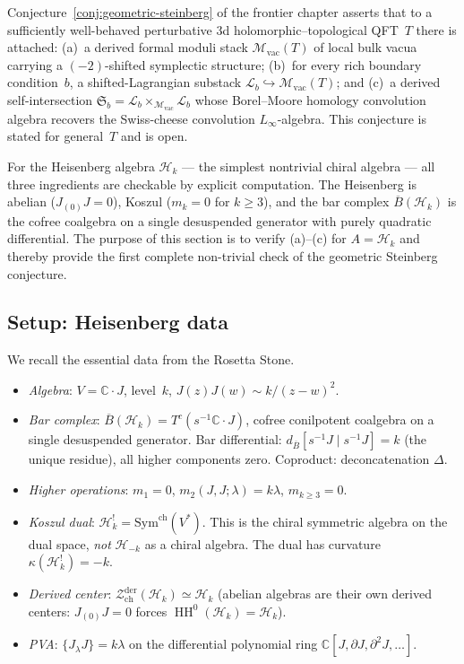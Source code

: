 \documentclass[11pt]{article}
\newcommand{\cM}{\mathcal{M}}
\newcommand{\cH}{\mathcal{H}}
\newcommand{\cZ}{\mathcal{Z}}
\newcommand{\cL}{\mathcal{L}}
\newcommand{\barB}{\overline{B}}
\newcommand{\C}{\mathbb{C}}
\newcommand{\HH}{\operatorname{HH}}
\newcommand{\Zder}{\cZ^{\mathrm{der}}_{\mathrm{ch}}}
\begin{document}
Conjecture~\ref{conj:geometric-steinberg} of the frontier chapter
asserts that to a sufficiently well-behaved perturbative 3d
holomorphic--topological QFT~$T$ there is attached: (a)~a derived
formal moduli stack $\cM_{\mathrm{vac}}(T)$ of local bulk vacua
carrying a $(-2)$-shifted symplectic structure; (b)~for every rich
boundary condition~$b$, a shifted-Lagrangian substack
$\cL_b \hookrightarrow \cM_{\mathrm{vac}}(T)$; and (c)~a derived
self-intersection $\mathfrak{S}_b = \cL_b \times_{\cM_{\mathrm{vac}}}
\cL_b$ whose Borel--Moore homology convolution algebra recovers
the Swiss-cheese convolution $L_\infty$-algebra.  This conjecture is
stated for general~$T$ and is open.

For the Heisenberg algebra $\cH_k$ --- the simplest nontrivial
chiral algebra --- all three ingredients are checkable by explicit
computation.  The Heisenberg is abelian ($J_{(0)}J = 0$), Koszul
($m_k = 0$ for $k \ge 3$), and the bar complex $\barB(\cH_k)$ is
the cofree coalgebra on a single desuspended generator with purely
quadratic differential.  The purpose of this section is to verify
(a)--(c) for $A = \cH_k$ and thereby provide the first complete
non-trivial check of the geometric Steinberg conjecture.

\subsection{Setup: Heisenberg data}

We recall the essential data from the Rosetta Stone.

\begin{itemize}[leftmargin=1.8em]
\item \emph{Algebra}: $V = \C \cdot J$, level~$k$,
  $J(z)J(w) \sim k/(z-w)^2$.

\item \emph{Bar complex}: $\barB(\cH_k) = T^c(s^{-1}\C\cdot J)$,
  cofree conilpotent coalgebra on a single desuspended generator.
  Bar differential: $d_{\barB}[s^{-1}J \mid s^{-1}J] = k$
  (the unique residue), all higher components zero.  Coproduct:
  deconcatenation $\Delta$.

\item \emph{Higher operations}: $m_1 = 0$,
  $m_2(J,J;\lambda) = k\lambda$, $m_{k \ge 3} = 0$.

\item \emph{Koszul dual}: $\cH_k^! = \mathrm{Sym}^{\mathrm{ch}}(V^*)$.
  This is the chiral symmetric algebra on the dual space, \emph{not}
  $\cH_{-k}$ as a chiral algebra.  The dual has curvature
  $\kappa(\cH_k^!) = -k$.

\item \emph{Derived center}: $\Zder(\cH_k) \simeq \cH_k$ (abelian
  algebras are their own derived centers: $J_{(0)}J = 0$ forces
  $\HH^0(\cH_k) = \cH_k$).

\item \emph{PVA}: $\{J_\lambda J\} = k\lambda$ on the differential
  polynomial ring $\C[J, \partial J, \partial^2 J, \ldots]$.
\end{itemize}
\end{document}
